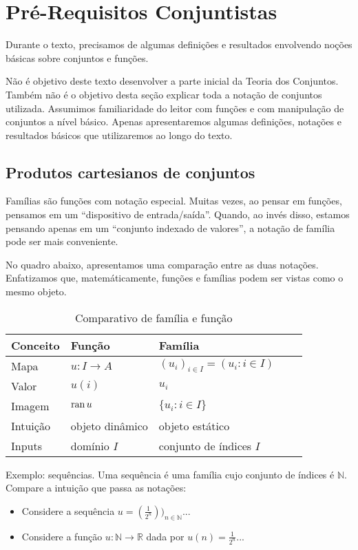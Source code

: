 
\chapter{Pré-Requisitos Conjuntistas}
Durante o texto, precisamos de algumas definições e resultados envolvendo noções básicas sobre conjuntos e funções.

Não é objetivo deste texto desenvolver a parte inicial da Teoria dos Conjuntos. Também não é o objetivo desta seção explicar toda a notação de conjuntos utilizada. Assumimos familiaridade do leitor com funções e com manipulação de conjuntos a nível básico. Apenas apresentaremos algumas definições, notações e resultados básicos que utilizaremos ao longo do texto.

\section{Produtos cartesianos de conjuntos}

Famílias são funções com notação especial. Muitas vezes, ao pensar em funções, pensamos em um ``dispositivo de entrada/saída''. Quando, ao invés disso, estamos pensando apenas em um  ``conjunto indexado de valores'', a notação de família pode ser mais conveniente.

No quadro abaixo, apresentamos uma comparação entre as duas notações. Enfatizamos que, matemáticamente, funções e famílias podem ser vistas como o mesmo objeto.
\begin{table}[h]
    \centering
    \begin{tabular}{lllll}
        \hline
        \textbf{Conceito} & \textbf{Função} & \textbf{Família} \\ \hline
        Mapa & $u:I\rightarrow A$ & $(u_i)_{i \in I}=(u_i: i \in I)$ \\
        Valor & $u(i)$ & $u_i$ \\
        Imagem & $\operatorname{ran} u$ & $\{u_i: i \in I\}$\\
        Intuição & objeto dinâmico & objeto estático \\
        Inputs & domínio $I$ & conjunto de índices $I$ \\
        \hline
    \end{tabular}
    \caption{Comparativo de família e função}
\end{table}

Exemplo: sequências. Uma sequência é uma família cujo conjunto de índices é $\mathbb N$. Compare a intuição que passa as notações:
\begin{itemize}
\item Considere a sequência $u=(\frac{1}{2^n}))_{n \in \mathbb N}$...
\item Considere a função $u:\mathbb N\rightarrow \mathbb R$ dada por $u(n)=\frac{1}{2^n}$...
\end{itemize}

